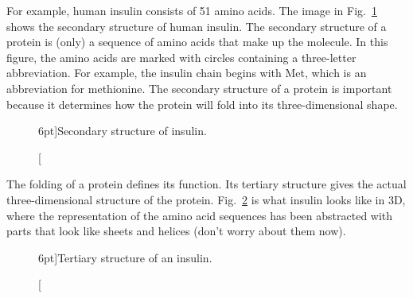 For example, human insulin consists of 51 amino acids. The image in Fig.~\ref{fig:insulin-secondary} shows the secondary structure of human insulin. The secondary structure of a protein is (only) a sequence of amino acids that make up the molecule. In this figure, the amino acids are marked with circles containing a three-letter abbreviation. For example, the insulin chain begins with Met, which is an abbreviation for methionine. The secondary structure of a protein is important because it determines how the protein will fold into its three-dimensional shape.

\begin{figure}
    \caption[][6pt]{Secondary structure of insulin.}
    \label{fig:insulin-secondary}
\end{figure}

The folding of a protein defines its function. Its tertiary structure gives the actual three-dimensional structure of the protein. Fig.~\ref{fig:insulin-3d} is what insulin looks like in 3D, where the representation of the amino acid sequences has been abstracted with parts that look like sheets and helices (don't worry about them now).

\begin{figure}
    \caption[][6pt]{Tertiary structure of an insulin.}
    \label{fig:insulin-3d}
\end{figure}

